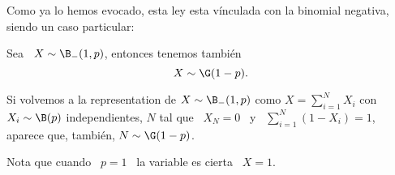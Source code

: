 Como ya  lo hemos evocado, esta  ley esta v\'inculada con  la binomial negativa,
siendo un caso particular:
\begin{lema}\label{Lem:MP:VinculoGeomBinoNegativa}
%
  Sea \ $X \sim \B_-(1,p)$, entonces tenemos tambi\'en
  \[
  X \sim \G(1-p).
  \]
\end{lema}
%
Si volvemos  a la representation  de $X \sim  \B_-(1,p)$ como $X  = \sum_{i=1}^N
X_i$  con $X_i  \sim \B(p)$  independientes,  $N$ tal  que \  $X_N  = 0$  \ y  \
$\sum_{i=1}^N (1-X_i) = 1$, aparece que, tambi\'en, $N \sim \G(1-p)$.

Nota que cuando \  $p =  1$ \ la variable es cierta \  $X = 1$.